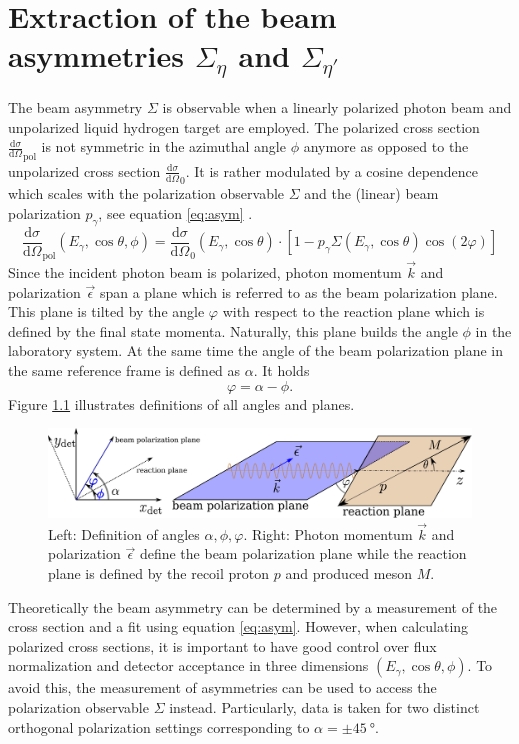 \chapter{Extraction of the beam asymmetries $\Sigma_{\eta}$ and $\Sigma_{\eta'}$}
The beam asymmetry $\Sigma$ is observable when a linearly polarized photon beam and unpolarized liquid hydrogen target are employed. The polarized cross section $\frac{\text{d}\sigma}{\text{d}\Omega}_\text{pol}$ is not symmetric in the azimuthal angle $\phi$ anymore as opposed to the unpolarized cross section $\frac{\text{d}\sigma}{\text{d}\Omega}_0$. It is rather modulated by a cosine dependence which scales with the polarization observable $\Sigma$ and the (linear) beam polarization $p_\gamma$, see equation \eqref{eq:asym} \cite{san}.
\begin{equation}
	\frac{\text{d}\sigma}{\text{d}\Omega}_\text{pol}\left(E_\gamma,\cos\theta,\phi\right)=\frac{\text{d}\sigma}{\text{d}\Omega}_0\left(E_\gamma,\cos\theta\right)\cdot\left[1-p_\gamma\Sigma\left(E_\gamma,\cos\theta\right)\cos\left(2\varphi\right)\right]
	\label{eq:asym}
\end{equation}
Since the incident photon beam is polarized, photon momentum $\vec{k}$ and polarization $\vec{\epsilon}$ span a plane which is referred to as the beam polarization plane. This plane is tilted by the angle $\varphi$ with respect to the reaction plane which is defined by the final state momenta. Naturally, this plane builds the angle $\phi$ in the laboratory system. At the same time the angle of the beam polarization plane in the same reference frame is defined as $\alpha$. It holds 
\begin{equation}
	\varphi=\alpha-\phi.
\end{equation} Figure \ref{fig:angles} illustrates definitions of all angles and planes. 
 \begin{figure}[htbp]
	\centering
	\includegraphics[width=\linewidth]{../DPG2022/figs/angles.pdf}
	\caption{Left: Definition of angles $\alpha,\phi,\varphi$. Right: Photon momentum $\vec{k}$ and polarization  $\vec{\epsilon}$ define the beam polarization plane while the reaction plane is defined by the recoil proton $p$ and produced meson $M$.}
	\label{fig:angles}
\end{figure} 
Theoretically the beam asymmetry can be determined by a measurement of the cross section and a fit using equation \eqref{eq:asym}. However, when calculating polarized cross sections, it is important to have good control over flux normalization and detector acceptance in three dimensions $(E_\gamma,\cos\theta,\phi)$. To avoid this, the measurement of asymmetries can be used to access the polarization observable $\Sigma$ instead. Particularly, data is taken for two distinct orthogonal polarization settings corresponding to $\alpha=\pm\SI{45}{\degree}$.

